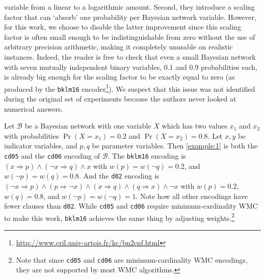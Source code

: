 variable from a linear to a logarithmic amount. Second, they introduce a scaling
factor that can `absorb' one probability per Bayesian network variable. However,
for this work, we choose to disable the latter improvement since this scaling
factor is often small enough to be indistinguishable from zero without the use
of arbitrary precision arithmetic, making it completely unusable on realistic
instances. Indeed, the reader is free to check that even a small Bayesian
network with seven mutually independent binary variables, 0.1 and 0.9
probabilities each, is already big enough for the scaling factor to be exactly
equal to zero (as produced by the \texttt{bklm16}
encoder\footnote{\url{http://www.cril.univ-artois.fr/kc/bn2cnf.html}}). We
suspect that this issue was not identified during the original set of
experiments because the authors never looked at numerical answers.

\begin{example} \label{example:2}
  Let $\mathcal{B}$ be a Bayesian network with one variable $X$ which has two
  values $x_1$ and $x_2$ with probabilities $\Pr(X = x_1) = 0.2$ and $\Pr(X =
  x_2) = 0.8$. Let $x, y$ be indicator variables, and $p, q$ be parameter
  variables. Then \cref{example:1} is both the \texttt{cd05} and the
  \texttt{cd06} encoding of $\mathcal{B}$. The \texttt{bklm16} encoding is $(x
  \Rightarrow p) \land (\neg x \Rightarrow q) \land x$ with $w(p) = w(\neg q) =
  0.2$, and $w(\neg p) = w(q) = 0.8$. And the \texttt{d02} encoding is $(\neg x
  \Rightarrow p) \land (p \Rightarrow \neg x) \land (x \Rightarrow q) \land (q
  \Rightarrow x) \land \neg x$ with $w(p) = 0.2$, $w(q) = 0.8$, and $w(\neg p) =
  w(\neg q) = 1$. Note how all other encodings have fewer clauses than
  \texttt{d02}. While \texttt{cd05} and \texttt{cd06} require
  minimum-cardinality WMC to make this work, \texttt{bklm16} achieves the same
  thing by adjusting weights.\footnote{Note that since \texttt{cd05} and
    \texttt{cd06} are minimum-cardinality WMC encodings, they are not supported
    by most WMC algorithms.}
\end{example}



